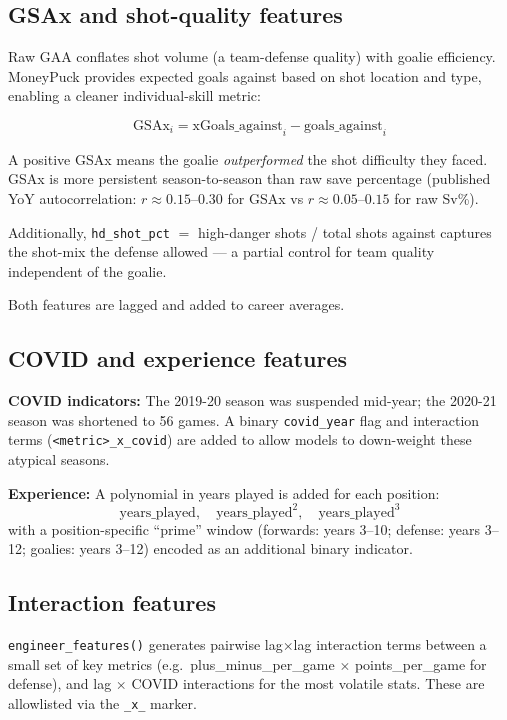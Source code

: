 \documentclass[11pt, a4paper]{article}
\begin{document}
\subsection{GSAx and shot-quality features}
\label{sec:gsax}

Raw GAA conflates shot volume (a team-defense quality) with goalie efficiency. MoneyPuck
provides expected goals against based on shot location and type, enabling a cleaner
individual-skill metric:

\begin{equation}
  \text{GSAx}_i = \text{xGoals\_against}_i - \text{goals\_against}_i
\end{equation}

A positive GSAx means the goalie \emph{outperformed} the shot difficulty they faced.
GSAx is more persistent season-to-season than raw save percentage (published YoY autocorrelation:
$r \approx 0.15$--$0.30$ for GSAx vs $r \approx 0.05$--$0.15$ for raw Sv\%).

Additionally, \texttt{hd\_shot\_pct} $= $ high-danger shots / total shots against captures the
shot-mix the defense allowed — a partial control for team quality independent of the goalie.

Both features are lagged and added to career averages.

\subsection{COVID and experience features}

\textbf{COVID indicators:} The 2019-20 season was suspended mid-year; the 2020-21 season was
shortened to 56 games. A binary \texttt{covid\_year} flag and interaction terms
(\texttt{<metric>\_x\_covid}) are added to allow models to down-weight these atypical seasons.

\textbf{Experience:} A polynomial in years played is added for each position:
\[
  \text{years\_played},\quad \text{years\_played}^2,\quad \text{years\_played}^3
\]
with a position-specific ``prime'' window (forwards: years 3--10; defense: years 3--12;
goalies: years 3--12) encoded as an additional binary indicator.

\subsection{Interaction features}

\texttt{engineer\_features()} generates pairwise lag$\times$lag interaction terms between a
small set of key metrics (e.g.\ plus\_minus\_per\_game $\times$ points\_per\_game for defense),
and lag $\times$ COVID interactions for the most volatile stats. These are allowlisted via the
\texttt{\_x\_} marker.
\end{document}
